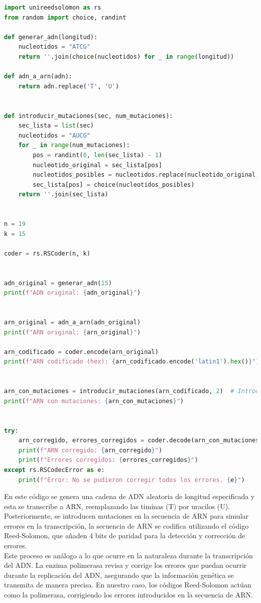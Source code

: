 \begin{lstlisting}[language=Python]
import unireedsolomon as rs
from random import choice, randint

def generar_adn(longitud):
    nucleotidos = "ATCG"
    return ''.join(choice(nucleotidos) for _ in range(longitud))

def adn_a_arn(adn):
    return adn.replace('T', 'U')


def introducir_mutaciones(sec, num_mutaciones):
    sec_lista = list(sec)
    nucleotidos = "AUCG"
    for _ in range(num_mutaciones):
        pos = randint(0, len(sec_lista) - 1)
        nucleotido_original = sec_lista[pos]
        nucleotidos_posibles = nucleotidos.replace(nucleotido_original, '')
        sec_lista[pos] = choice(nucleotidos_posibles)
    return ''.join(sec_lista)


n = 19  
k = 15  

coder = rs.RSCoder(n, k)


adn_original = generar_adn(15)
print(f"ADN original: {adn_original}")


arn_original = adn_a_arn(adn_original)
print(f"ARN original: {arn_original}")

arn_codificado = coder.encode(arn_original)
print(f"ARN codificado (hex): {arn_codificado.encode('latin1').hex()}")


arn_con_mutaciones = introducir_mutaciones(arn_codificado, 2)  # Introducir 2 mutaciones
print(f"ARN con mutaciones: {arn_con_mutaciones}")


try:
    arn_corregido, errores_corregidos = coder.decode(arn_con_mutaciones)
    print(f"ARN corregido: {arn_corregido}")
    print(f"Errores corregidos: {errores_corregidos}")
except rs.RSCodecError as e:
    print(f"Error: No se pudieron corregir todos los errores. {e}")
\end{lstlisting}

En este código se genera una cadena de ADN aleatoria de longitud especificada y esta se transcribe a ARN, reemplazando las timinas (T) por uracilos (U). Posteriormente, se introducen mutaciones en la secuencia de ARN para simular errores en la transcripción, la secuencia de ARN se codifica utilizando el código Reed-Solomon, que añaden $4$ bits de paridad para la detección y corrección de errores.\\

Este proceso es análogo a lo que ocurre en la naturaleza durante la transcripción del ADN. La enzima polimerasa revisa y corrige los errores que puedan ocurrir durante la replicación del ADN, asegurando que la información genética se transmita de manera precisa. En nuestro caso, los códigos Reed-Solomon actúan como la polimerasa, corrigiendo los errores introducidos en la secuencia de ARN.\\


